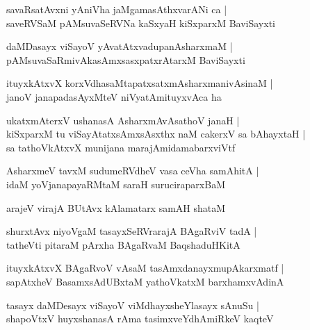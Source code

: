 \begin{shloka}
savaRsatAvxni yAniVha jaMgamasAthxvarANi ca |\\
saveRVSaM pAMsuvaSeRVNa kaSxyaH kiSxparxM BaviSayxti 
\end{shloka}

\begin{shloka}
daMDasayx viSayoV yAvatAtxvadupanAsharxmaM |\\
pAMsuvaSaRmivAkasAmxsasxpatxrAtarxM BaviSayxti
\end{shloka}

\begin{shloka}
ituyxkAtxvX korxVdhasaMtapatxsatxmAsharxmanivAsinaM |\\
janoV janapadasAyxMteV niVyatAmituyxvAca ha
\end{shloka}

\begin{shloka}
ukatxmAterxV ushanasA AsharxmAvAsathoV janaH |\\
kiSxparxM tu viSayAtatxsAmxsAsxthx naM cakerxV sa bAhayxtaH |\\
sa tathoVkAtxvX munijana marajAmidamabarxviVtf
\end{shloka}

\begin{shloka}
AsharxmeV tavxM sudumeRVdheV vasa ceVha samAhitA |\\
idaM yoVjanapayaRMtaM saraH suruciraparxBaM 
\end{shloka}

\begin{shloka}
arajeV virajA BUtAvx kAlamatarx samAH shataM
\end{shloka}

\begin{shloka}
shurxtAvx niyoVgaM tasayxSeRVrarajA BAgaRviV tadA |\\
tatheVti pitaraM pArxha BAgaRvaM BaqshaduHKitA 
\end{shloka}

\begin{shloka}
ituyxkAtxvX BAgaRvoV vAsaM tasAmxdanayxmupAkarxmatf |\\
sapAtxheV BasamxsAdUBxtaM yathoVkatxM barxhamxvAdinA
\end{shloka}

\begin{shloka}
tasayx daMDesayx viSayoV viMdhayxsheYlasayx sAnuSu |\\
shapoVtxV huyxshanasA rAma tasimx\R veYdhAmiRkeV kaqteV 
\end{shloka}

